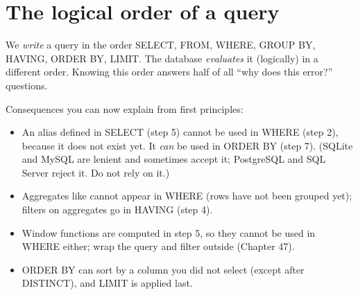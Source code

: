 \section{The logical order of a query}\label{sec:sqlorder}
We \emph{write} a query in the order SELECT, FROM, WHERE, GROUP BY, HAVING, ORDER BY, LIMIT. The database \emph{evaluates} it (logically) in a different
order. Knowing this order answers half of all ``why does this error?'' questions.
\begin{center}
\end{center}
Consequences you can now explain from first principles:
\begin{itemize}
\item An alias defined in SELECT (step 5) cannot be used in WHERE (step 2), because it does not exist yet. It \emph{can} be used in ORDER BY (step 7).
(SQLite and MySQL are lenient and sometimes accept it; PostgreSQL and SQL Server reject it. Do not rely on it.)
\item Aggregates like  cannot appear in WHERE (rows have not been grouped yet); filters on aggregates go in HAVING (step 4).
\item Window functions are computed in step 5, so they cannot be used in WHERE either; wrap the query and filter outside (Chapter 47).
\item ORDER BY can sort by a column you did not select (except after DISTINCT), and LIMIT is applied last.
\end{itemize}

